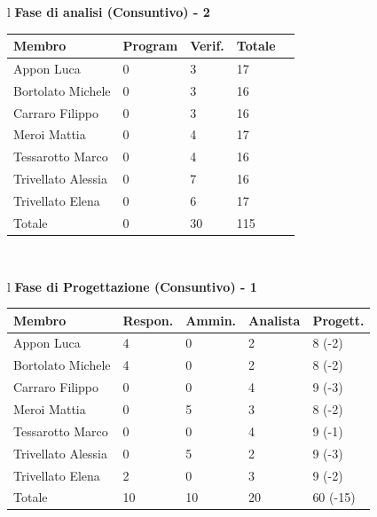 \documentclass[11pt,titlepage,a4paper]{report}
\begin{document}
\begin{table}[hbtp]
\large{
\begin{tabular}{l}
\Large{\textbf{\textsf{Fase di analisi (Consuntivo) - 2}}} \\
\begin{tabular}{||p{3.5cm}||p{2cm}||p{2cm}||p{2cm}||p{2cm}||}
\hline
\textbf{Membro} & \textbf{Program} & \textbf{Verif.} & \textbf{Totale}\\ \hline
{Appon Luca}&0&3&17 \\ \hline 
{Bortolato Michele} &0&3&16\\ \hline
{Carraro Filippo}&0&3&16 \\ \hline
{Meroi Mattia}&0&4&17\\ \hline
{Tessarotto Marco} &0&4&16\\ \hline
{Trivellato Alessia} &0&7&16 \\ \hline
{Trivellato Elena} &0&6&17 \\ \hline
{Totale} &0&30&115 \\ \hline
\end{tabular} \\
\end{tabular}
}
\end{table}


\begin{table}[hbtp]
\large{
\begin{tabular}{l}
\Large{\textbf{\textsf{Fase di Progettazione (Consuntivo) - 1}}} \\
\begin{tabular}{||p{3.5cm}||p{2cm}||p{2cm}||p{2cm}||p{2cm}||}
\hline

\textbf{Membro} & \textbf{Respon.} & \textbf{Ammin.} & \textbf{Analista}
& \textbf{Progett.}\\
\hline
{Appon Luca}&4&0&2&8 \footnotesize{(-2)} \\ 
\hline 
{Bortolato Michele} &4&0&2&8 \footnotesize{(-2)}\\ 
\hline
{Carraro Filippo}&0&0&4&9 \footnotesize{(-3)} \\
\hline
{Meroi Mattia}&0&5&3&8 \footnotesize{(-2)}\\
\hline
{Tessarotto Marco} &0&0&4&9 \footnotesize{(-1)}\\
\hline
{Trivellato Alessia} &0&5&2&9 \footnotesize{(-3)} \\
\hline
{Trivellato Elena} &2&0&3&9 \footnotesize{(-2)} \\
\hline
{Totale}& 10&10&20&60 \footnotesize{(-15)} \\
\hline

\end{tabular} \\
\end{tabular}
}
\end{table}
\end{document}
